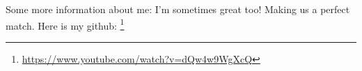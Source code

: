 Some more information about me: I'm sometimes great too! Making us a perfect match.
Here is my github: \footnote{\url{https://www.youtube.com/watch?v=dQw4w9WgXcQ}}

